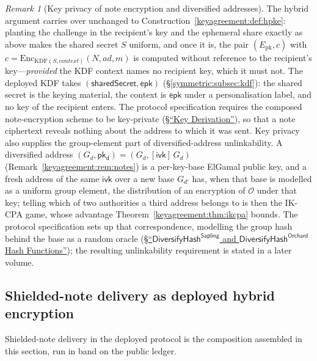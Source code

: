 \documentclass[11pt,a4paper]{article}
\theoremstyle{definition}
\theoremstyle{remark}
\newtheorem{remark}[theorem]{Remark}
\begin{document}
\begin{remark}[Key privacy of note encryption and diversified addresses]
\label{keyagreement:rem:keyprivacy-deployed}
The hybrid argument carries over unchanged to
Construction~\ref{keyagreement:def:hpke}: planting the challenge in
the recipient's key and the ephemeral share exactly as above makes
the shared secret \(S\) uniform, and once it is, the pair
\((E_{\mathrm{pk}}, c)\) with
\(c = \mathrm{Enc}_{\mathrm{KDF}(S, \mathit{context})}
(N, \mathit{ad}, m)\) is computed without reference to the
recipient's key---\emph{provided} the KDF context names no recipient
key, which it must not. The deployed KDF takes
\((\mathsf{sharedSecret}, \mathsf{epk})\)
(\S\ref{symmetric:subsec:kdf}): the shared secret is the keying
material, the context is \(\mathsf{epk}\) under a personalisation
label, and no key of the recipient enters. The protocol
specification requires the composed note-encryption scheme to be
key-private (\href{https://zips.z.cash/protocol/protocol.pdf\#abstractkdf}{\S``Key Derivation''}),
so that a note ciphertext reveals nothing about the address to which it
was sent. Key privacy also supplies the group-element part of
diversified-address unlinkability.
A diversified address
\((G_{d}, \mathsf{pk_d}) = (G_{d}, [\mathsf{ivk}]\,G_{d})\)
(Remark~\ref{keyagreement:rem:notes}) is a per-key-base ElGamal
public key, and a fresh address of the same \(\mathsf{ivk}\) over a
new base \(G_{d'}\) has, when that base is modelled as a uniform
group element, the distribution of an encryption of \(\mathcal{O}\)
under that key; telling which of two authorities a third address
belongs to is then the IK-CPA game, whose advantage
Theorem~\ref{keyagreement:thm:ikcpa} bounds. The protocol
specification sets up that correspondence, modelling the group hash
behind the base as a random oracle
(\href{https://zips.z.cash/protocol/protocol.pdf\#concretediversifyhash}{\S``\(\mathsf{DiversifyHash}^{\mathsf{Sapling}}\) and
\(\mathsf{DiversifyHash}^{\mathsf{Orchard}}\) Hash Functions''}); the
resulting unlinkability requirement is stated in a later volume.
\end{remark}

\subsection{Shielded-note delivery as deployed hybrid encryption}
\label{keyagreement:subsec:notes}

Shielded-note delivery in the deployed protocol is the composition
assembled in this section, run in band on the public ledger.
\end{document}
